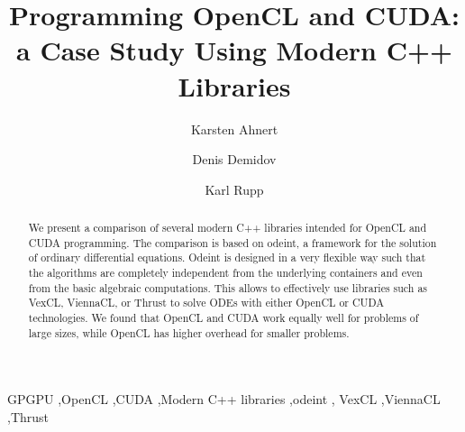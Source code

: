 \documentclass[1p]{elsarticle}
\begin{document}
\begin{frontmatter}

\title{Programming OpenCL and CUDA:\\a Case Study Using Modern C++ Libraries}

\author{Karsten Ahnert}
\address{
Institut f\"ur Physik und Astronomie, Universit\"at Potsdam,\\
Karl-Liebknecht-Strasse 24/25, 14476 Potsdam-Golm, Germany
}

\author{Denis Demidov}
\address{
Kazan Branch of Joint Supercomputer Center,
Russian Academy of Sciences,\\
Lobachevsky st. 2/31, 420008 Kazan, Russia
}

\author{Karl Rupp}
\address{Mathematics and Computer Science Division, Argonne National Laboratory \\
9700 South Cass Avenue, Argonne, IL 60439, USA
}

\begin{abstract}
    We present a comparison of several modern C++ libraries intended for OpenCL
    and CUDA programming. The comparison is based on odeint, a framework for
    the solution of ordinary differential equations. Odeint is designed in a
    very flexible way such that the algorithms are completely independent from
    the underlying containers and even from the basic algebraic computations.
    This allows to effectively use libraries such as VexCL, ViennaCL, or Thrust
    to solve ODEs with either OpenCL or CUDA technologies. We found that OpenCL
    and CUDA work equally well for problems of large sizes, while OpenCL has higher
    overhead for smaller problems.

\end{abstract}

\begin{keyword}
    GPGPU \sep OpenCL \sep CUDA \sep Modern C++ libraries \sep odeint \sep
    VexCL \sep ViennaCL \sep Thrust
\end{keyword}

\end{frontmatter}
\end{document}
